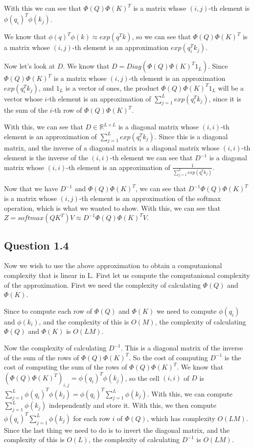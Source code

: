 \documentclass{article}
\begin{document}
With this we can see that $\Phi(Q) \Phi(K)^T$ is a matrix whose $(i,j)$-th element is $\phi(q_i)^T \phi(k_j)$.

We know that $\phi(q)^T\phi(k) \approx exp(q^Tk)$, so we can see that $\Phi(Q) \Phi(K)^T$ is a matrix whose $(i,j)$-th element is an 
approximation $exp(q_i^Tk_j)$.

\bigskip

Now let's look at $D$. We know that $D = Diag(\Phi(Q) \Phi(K)^T 1_L)$. Since $\Phi(Q) \Phi(K)^T$ is a matrix whose $(i,j)$-th element is an
approximation $exp(q_i^Tk_j)$, and $1_L$ is a vector of ones, the product $\Phi(Q) \Phi(K)^T 1_L$ will be a vector whose $i$-th element
is an approximation of $\sum_{j=1}^L exp(q_i^Tk_j)$, since it is the sum of the $i$-th row of $\Phi(Q) \Phi(K)^T$.

With this, we can see that $D \in \mathbb{R}^{L\times L}$ is a diagonal matrix whose $(i, i)$-th element is an approximation of $\sum_{j=1}^L exp(q_i^Tk_j)$.
Since this is a diagonal matrix, and the inverse of a diagonal matrix is a diagonal matrix whose $(i, i)$-th element is the inverse of the $(i, i)$-th element
we can see that $D^{-1}$ is a diagonal matrix whose $(i, i)$-th element is an approximation of $\frac{1}{\sum_{j=1}^L exp(q_i^Tk_j)}$.

\bigskip

Now that we have $D^{-1}$ and $\Phi(Q) \Phi(K)^T$, we can see that $D^{-1}\Phi(Q) \Phi(K)^T$ is a matrix whose $(i,j)$-th element is an approximation of
the softmax operation, which is what we wanted to show. With this, we can see that $Z = softmax(QK^T)V \approx D^{-1}\Phi(Q) \Phi(K)^T V$.

\subsection{Question 1.4}

Now we wish to use the above approximation to obtain a computanional complexity that is linear in L. First let us compute the computanional complexity of the
approximation. First we need the complexity of calculating $\Phi(Q)$ and $\Phi(K)$.

Since to compute each row of $\Phi(Q)$ and $\Phi(K)$ we need to compute $\phi(q_i)$ and $\phi(k_i)$, and the complexity of this is $O(M)$, 
the complexity of calculating $\Phi(Q)$ and $\Phi(K)$ is $O(L M)$.

\bigskip

Now the complexity of calculating $D^{-1}$. This is a diagonal matrix of the inverse of the sum of the rows of $\Phi(Q) \Phi(K)^T$. So the cost of computing $D^{-1}$ is the cost
of computing the sum of the rows of $\Phi(Q) \Phi(K)^T$. We know that $(\Phi(Q) \Phi(K)^T)_{i,j} = \phi(q_i)^T \phi(k_j)$, so the cell $(i,i)$ of $D$ 
is $\sum_{j=1}^L \phi(q_i)^T \phi(k_j) = \phi(q_i)^T \sum_{j=1}^L \phi(k_j)$. With this, we can compute $\sum_{j=1}^L \phi(k_j)$ independently and store it.
With this, we then compute $\phi(q_i)^T \sum_{j=1}^L \phi(k_j)$ for each row $i$ of $\Phi(Q)$, which has complexity $O(L M)$. Since the last thing we need to do is 
to invert the diagonal matrix, and the complexity of this is $O(L)$, the complexity of calculating $D^{-1}$ is $O(L M)$.
\end{document}
